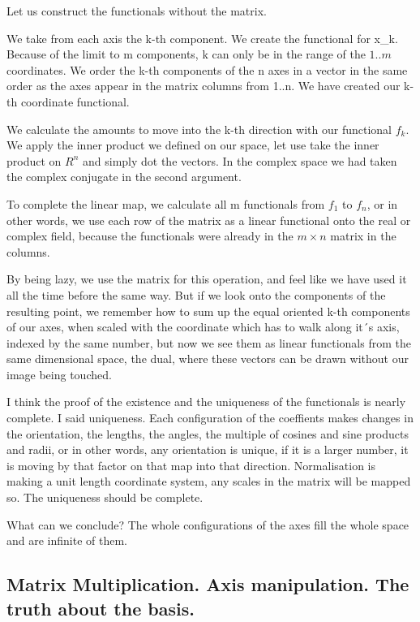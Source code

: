 \documentclass[a4paper]{article}
\begin{document}
Let us construct the functionals without the matrix.

We take from each axis the k-th component. We create the functional for x_k. Because of the limit to m components, k can only be in the range of the $1..m$ coordinates. We order the k-th components of the n axes in a vector in the same order as the axes appear in the matrix columns from 1..n. We have created our k-th coordinate functional.

We calculate the amounts to move into the k-th direction with our functional $f_k$. We apply the inner product we defined on our space, let use take the inner product on $R^n$ and simply dot the vectors. In the complex space we had taken the complex conjugate in the second argument. 

To complete the linear map, we calculate all m functionals from $f_1$ to $f_n$, or in other words, we use each row of the matrix as a linear functional onto the real or complex field, because the functionals were already in the $m \times n$ matrix in the columns. 

By being lazy, we use the matrix for this operation, and feel like we have used it all the time before the same way. But if we look onto the components of the resulting point, we remember how to sum up the equal oriented k-th components of our axes, when scaled with the coordinate which has to walk along it´s axis, indexed by the same number, but now we see them as linear functionals from the same dimensional space, the dual, where these vectors can be drawn without our image being touched.

I think the proof of the existence and the uniqueness of the functionals is nearly complete. I said uniqueness. Each configuration of the coeffients makes changes in the orientation, the lengths, the angles, the multiple of cosines and sine products and radii, or in other words, any orientation is unique, if it is a larger number, it is moving by that factor on that map into that direction. Normalisation is making a unit length coordinate system, any scales in the matrix will be mapped so. The uniqueness should be complete.

What can we conclude? The whole configurations of the axes fill the whole space and are infinite of them.


\subsection{Matrix Multiplication. Axis manipulation. The truth about the basis.}
\end{document}
